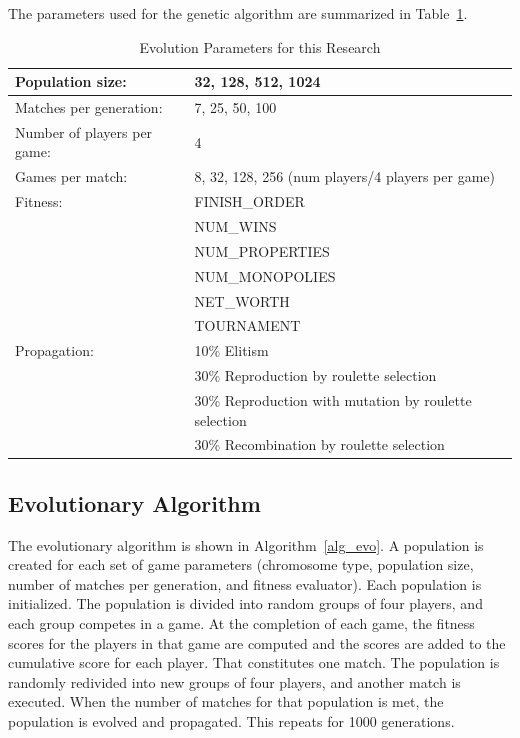 The parameters used for the genetic algorithm are summarized in
Table~\ref{table-evoparams}.

\begin{table}[ht]
\caption{Evolution Parameters for this Research}
\begin{center}
\begin{tabular}{ | l | l | }
  \hline                        
  Population size: & 32, 128, 512, 1024 \\ \hline
  Matches per generation: & 7, 25, 50, 100 \\ \hline
  Number of players per game: & 4 \\ \hline
  Games per match: & 8, 32, 128, 256 (num players/4 players per game) \\ \hline
  Fitness: & FINISH\_ORDER \\ 
           & NUM\_WINS \\
           & NUM\_PROPERTIES \\ 
           & NUM\_MONOPOLIES \\
           & NET\_WORTH \\ 
           & TOURNAMENT \\ \hline
  Propagation: & 10\% Elitism \\
               & 30\% Reproduction by roulette selection \\
               & 30\% Reproduction with mutation by roulette selection \\ 
               & 30\% Recombination by roulette selection \\ \hline  
\end{tabular}
\label{table-evoparams}
\end{center}
\end{table}

\subsection{Evolutionary Algorithm}

The evolutionary algorithm is shown in Algorithm~\ref{alg_evo}. A population is
created for each set of game parameters (chromosome type, population size,
number of matches per generation, and fitness evaluator). Each population is
initialized. The population is divided into random groups of four players, and
each group competes in a game. At the completion of each game, the fitness
scores for the players in that game are computed and the scores are added to the
cumulative score for each player. That constitutes one match. The population is
randomly redivided into new groups of four players, and another match is
executed. When the number of matches for that population is met, the population
is evolved and propagated. This repeats for 1000 generations.

